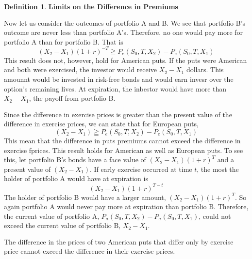 \documentclass{book}
\theoremstyle{definition}
\newtheorem{definition}{Definition}[section]
\theoremstyle{remark}
\begin{document}
            \begin{definition}{\textbf{Limits on the Difference in Premiums}}
            
                Now let us consider the outcomes of portfolio A and B. We see that portfolio B's outcome are never less than portfolio A's. Therefore, no one would pay more for portfolio A than for portfolio B. That is
                    \begin{equation}
                        (X_2 - X_1)(1 + r)^{-T} \geqq P_e(S_0,T,X_2) - P_e(S_0,T,X_1)
                    \end{equation}
                This result does not, however, hold for American  puts. If the puts were American and both were exercised, the investor would receive $X_2 - X_1$ dollars. This amounnt would be invested in risk-free bonds and would earn invesr over the option's remaining lives. At expiration, the inbestor would have more than $X_2 - X_1$, the payoff from portfolio B.
                
                Since the difference in exercise prices is greater than the present value of the difference in exercise prices, we can state that for European puts, 
                    \begin{equation}
                        (X_2  - X_1 ) \geqq P_e(S_0,T,X_2) - P_e(S_0, T, X_1)
                    \end{equation}
                This mean that the difference in puts premiums cannot exceed the difference in exercise fprices. This result holds for American as well as European puts. To see this, let portfolio B's bonds have a face value of $(X_2 - X_1)(1 + r)^T$ and a present value of $(X_2 - X_1)$. If early exercise occurred at time $t$, the most the holder of portfolio A would have at expiration is $$(X_2 - X_1)(1 + r)^{T- t}$$ The holder of portfolio B would have a larger amount, $(X_2 - X_1)(1 + r)^T$. So again portfolio A would never pay more at expiration than portfolio B. Therefore, the current value of portfolio A, $P_a(S_0,T,X_2) - P_a(S_0,T,X_1)$, could not exceed the current value of portfolio B, $X_2 - X_1$. 
                
        \begin{tcolorbox}[colback=blue!5!white,colframe=blue!75!black, title=Sticky Note]
            The difference in the prices of two American puts that differ only by exercise price cannot exceed the difference in their exercise prices.
        \end{tcolorbox}                  
                

\end{definition}
\end{document}
